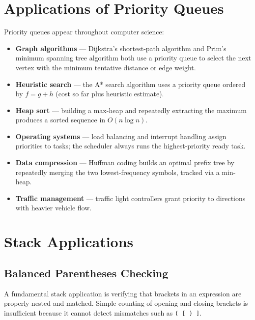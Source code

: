 \documentclass[11pt, a4paper, notitlepage]{report}
\theoremstyle{definition}
\theoremstyle{remark}
\theoremstyle{definition}
\begin{document}
\section{Applications of Priority Queues}
\label{sec:pq-applications}

Priority queues appear throughout computer science:
\begin{itemize}
  \item \textbf{Graph algorithms} --- Dijkstra's shortest-path algorithm and Prim's
        minimum spanning tree algorithm both use a priority queue to select the next
        vertex with the minimum tentative distance or edge weight.
  \item \textbf{Heuristic search} --- the A* search algorithm uses a priority queue
        ordered by $f = g + h$ (cost so far plus heuristic estimate).
  \item \textbf{Heap sort} --- building a max-heap and repeatedly extracting the maximum
        produces a sorted sequence in $O(n \log n)$.
  \item \textbf{Operating systems} --- load balancing and interrupt handling assign
        priorities to tasks; the scheduler always runs the highest-priority ready task.
  \item \textbf{Data compression} --- Huffman coding builds an optimal prefix tree by
        repeatedly merging the two lowest-frequency symbols, tracked via a min-heap.
  \item \textbf{Traffic management} --- traffic light controllers grant priority to
        directions with heavier vehicle flow.
\end{itemize}

\section{Stack Applications}
\label{sec:stack-applications}

\subsection{Balanced Parentheses Checking}
\label{subsec:balanced-parens}

A fundamental stack application is verifying that brackets in an expression are properly
nested and matched.  Simple counting of opening and closing brackets is insufficient because
it cannot detect mismatches such as \texttt{( [ ) ]}.
\end{document}

